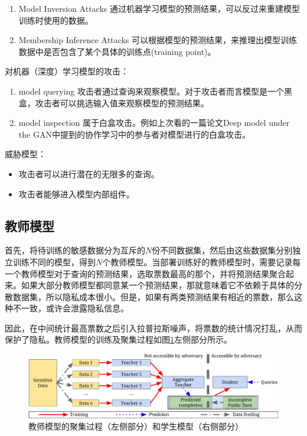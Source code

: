 \documentclass[a4paper]{article}
\begin{document}
\begin{enumerate}
\item Model Inversion Attacks 通过机器学习模型的预测结果，可以反过来重建模型训练时使用的数据。
\item Membership Inference Attacks 可以根据模型的预测结果，来推理出模型训练数据中是否包含了某个具体的训练点(training point)。
\end{enumerate}
对机器（深度）学习模型的攻击：
\begin{enumerate}
\item model querying 攻击者通过查询来观察模型。对于攻击者而言模型是一个黑盒，攻击者可以挑选输入值来观察模型的预测结果。
\item model inspection 属于白盒攻击。例如上次看的一篇论文Deep model under the GAN中提到的协作学习中的参与者对模型进行的白盒攻击。
\end{enumerate}
威胁模型：
\begin{itemize}
\item 攻击者可以进行潜在的无限多的查询。
\item 攻击者能够进入模型内部组件。
\end{itemize}

\subsection*{教师模型}

首先，将待训练的敏感数据分为互斥的$N$份不同数据集，然后由这些数据集分别独立训练不同的模型，得到$N$个教师模型。当部署训练好的教师模型时，需要记录每一个教师模型对于查询的预测结果，选取票数最高的那个，并将预测结果聚合起来。如果大部分教师模型都同意某一个预测结果，那就意味着它不依赖于具体的分散数据集，所以隐私成本很小。但是，如果有两类预测结果有相近的票数，那么这种不一致，或许会泄露隐私信息。

因此，在中间统计最高票数之后引入拉普拉斯噪声，将票数的统计情况打乱，从而保护了隐私。教师模型的训练及聚集过程如图\ref*{fig:overview}左侧部分所示。

\begin{figure}[!h]
\includegraphics[width = \linewidth]{fig/approach-overview.pdf}
\caption{教师模型的聚集过程（左侧部分）和学生模型（右侧部分）}
\label{fig:overview}
\end{figure}
\end{document}
